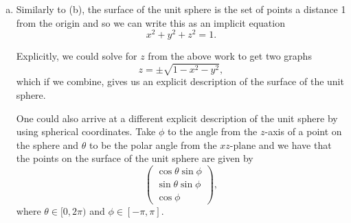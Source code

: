 \documentclass[12pt]{article} %
\begin{document}
\begin{solution}
\begin{enumerate}[(a)]
        Explicitly, we can solve for $y$ in terms of $x$ from the previous work to get
        \[
        y=\pm \sqrt{1-x^2}.
        \]
        Taking $y=\sqrt{1-x^2}$ we know $y\geq 0$, and this gives us the upper half of the unit circle as the graph of a function. 
        
        Or, we could parameterize this as a curve to get another implicit description.  We know the curve $\curvegamma(t) = \begin{pmatrix} \cos(t) \\ \sin(t)\end{pmatrix}$ lie on the unit circle for all times $t$.  Then, if we restrict $t\in [0,\pi]$, this gives us just the upper half.
        
        \item Similarly to (b), the surface of the unit sphere is the set of points a distance 1 from the origin and so we can write this as an implicit equation
        \[
        x^2+y^2+z^2=1.
        \]
        
        Explicitly, we could solve for $z$ from the above work to get two graphs
        \[
        z = \pm \sqrt{1-x^2-y^2},
        \]
        which if we combine, gives us an explicit description of the surface of the unit sphere.  
        
        One could also arrive at a different explicit description of the unit sphere by using spherical coordinates. Take $\phi$ to the angle from the $z$-axis of a point on the sphere and $\theta$ to be the polar angle from the $xz$-plane and we have that the points on the surface of the unit sphere are given by
        \[
        \begin{pmatrix} \cos\theta\sin\phi \\ \sin\theta \sin \phi \\ \cos \phi \end{pmatrix},
        \] 
        where $\theta \in [0,2\pi)$ and $\phi \in [-\pi,\pi]$.
    \end{enumerate}
\end{solution}
\end{document}
